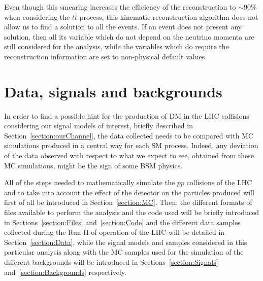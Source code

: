 \documentclass[a4paper, 10pt, openright]{report}
\begin{document}
Even though this smearing increases the efficiency of the reconstruction to $\sim 90$\% when considering the $t \bar t$ process, this kinematic reconstruction algorithm does not allow us to find a solution to all the events. If an event does not present any solution, then all its variable which do not depend on the neutrino momenta are still considered for the analysis, while the variables which do require the reconstruction information are set to non-physical default values.

























\chapter{Data, signals and backgrounds} \label{chapter:Samples}

In order to find a possible hint for the production of \ac{DM} in the \ac{LHC} collisions considering our signal models of interest, briefly described in Section~\ref{section:ourChannel}, the data collected needs to be compared with \acf{MC} simulations produced in a central way for each \ac{SM} process. Indeed, any deviation of the data observed with respect to what we expect to see, obtained from these \ac{MC} simulations, might be the sign of some \ac{BSM} physics. 

All of the steps needed to mathematically simulate the $pp$ collisions of the \ac{LHC} and to take into account the effect of the detector on the particles produced will first of all be introduced in Section~\ref{section:MC}. Then, the different formats of files available to perform the analysis and the code used will be briefly introduced in Sections~\ref{section:Files} and~\ref{section:Code} and the different data samples collected during the Run II of operation of the \ac{LHC} will be detailed in Section~\ref{section:Data}, while the signal models and samples considered in this particular analysis along with the \ac{MC} samples used for the simulation of the different backgrounds will be introduced in Sections~\ref{section:Signals} and~\ref{section:Backgrounds} respectively.
\end{document}
